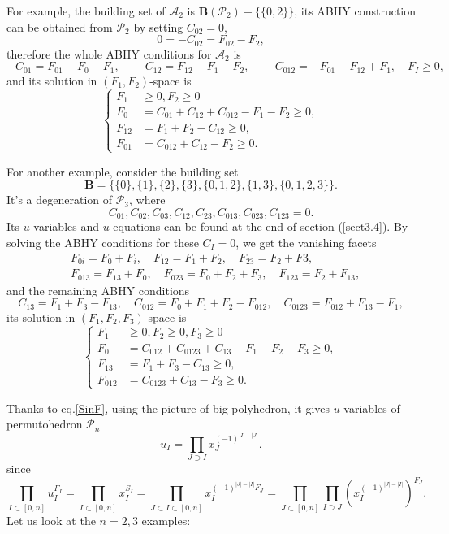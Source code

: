 \documentclass[hidelinks,12pt]{article}
\newcommand{\bea}[1]{\begin{eqnarray}\label{#1} }
\newcommand{\eea}{\end{eqnarray}}
\def\bea{\begin{eqnarray}}
\def\eea{\end{eqnarray}}
\begin{document}
For example, the building set of $\mathscr A_2$ is $\mathbf B(\mathscr P_2)-\{\{0,2\}\}$,
its ABHY construction can be obtained from $\mathscr P_2$ by setting $C_{02}=0$, 
\[
	0=-C_{02}=F_{02}-F_2,
\]
therefore the whole ABHY conditions for $\mathscr A_2$ is 
\[
	-C_{01}=F_{01}-F_0-F_1,\quad -C_{12}=F_{12}-F_1-F_2,\quad 
	-C_{012}=-F_{01}-F_{12}+F_1,\quad F_I\geq 0,
\]
and its solution in $(F_1,F_2)$-space is 
\[
	\left\{\begin{aligned}
		F_1&\geq 0,F_2\geq 0\\
		F_0&=C_{01}+C_{12}+C_{012}-F_1-F_2\geq 0,\\
		F_{12}&=F_1+F_2-C_{12}\geq 0,\\
		F_{01}&=C_{012}+C_{12}-F_2\geq 0.
	\end{aligned}\right.
\]

For another example, consider the building set
\[
\mathbf{B}=\{\{0\},\{1\},\{2\},\{3\},\{0,1,2\},\{1,3\},\{0,1,2,3\}\}.
\]
It's a degeneration of $\mathscr P_3$, where
\[
C_{01},C_{02},C_{03},C_{12},C_{23},C_{013},C_{023},C_{123}=0.
\]
Its $u$ variables and $u$ equations can be found at the end of section (\ref{sect3.4}). By solving the ABHY conditions for these $C_I=0$, we get the vanishing facets
\begin{align*}
&F_{0i}=F_0+F_i,\quad F_{12}=F_1+F_2,\quad F_{23}=F_2+F3,\\
&F_{013}=F_{13}+F_0,\quad F_{023}=F_0+F_2+F_3,\quad F_{123}=F_2+F_{13},
\end{align*}
and the remaining ABHY conditions
\[
C_{13}=F_1+F_3-F_{13},\quad C_{012}=F_{0}+F_{1}+F_2-F_{012},
\quad C_{0123}=F_{012}+F_{13}-F_1,
\]
its solution in $(F_1,F_2,F_3)$-space is 
\[
	\left\{\begin{aligned}
		F_1&\geq 0,F_2\geq 0,F_3\geq 0\\
		F_0&=C_{012}+C_{0123}+C_{13}-F_1-F_2-F_3\geq 0,\\
		F_{13}&=F_1+F_3-C_{13}\geq 0,\\
		F_{012}&=C_{0123}+C_{13}-F_3\geq 0.
	\end{aligned}\right.
\]

Thanks to eq.\eqref{SinF}, using the picture of big polyhedron, it gives $u$ variables of permutohedron $\mathscr P_n$
\begin{equation}
  u_I=\prod_{J\supset I}x_J^{(-1)^{|I|-|J|}}. \label{uvarforPn}
\end{equation}
since
\[
	\prod_{I\subset [0,n]}u_I^{F_I}=
	\prod_{I\subset [0,n]}x_I^{S_I}=
	\prod_{ J\subset I\subset [0,n]}
	x_I^{(-1)^{|J|-|I|}F_J}=
	\prod_{J\subset [0,n]}
	\prod_{I\supset J}(x_I^{(-1)^{|J|-|I|}})^{F_J}.
\]
Let us look at the $n=2,3$ examples:
\end{document}
